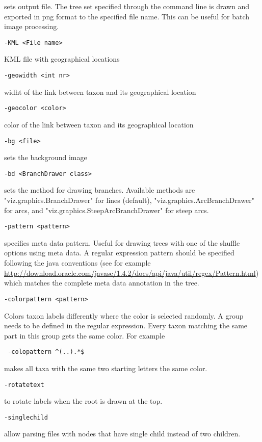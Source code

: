 \documentclass{article}
\begin{document}
sets output file. The tree set specified through the command line is drawn and
exported in png format to the specified file name. 
This can be useful for batch image processing.
\begin{verbatim}-KML <File name>\end{verbatim}
KML file with geographical locations
\begin{verbatim}-geowidth <int nr>\end{verbatim}
widht of the link between taxon and its geographical location
\begin{verbatim}-geocolor <color>\end{verbatim}
color of the link between taxon and its geographical location
\begin{verbatim}-bg <file>\end{verbatim}
sets the background image
\begin{verbatim}-bd <BranchDrawer class>\end{verbatim}
sets the method for drawing branches. Available methods are
"viz.graphics.BranchDrawer" for lines (default),
"viz.graphics.ArcBranchDrawer" for arcs, and
"viz.graphics.SteepArcBranchDrawer" for steep arcs.
\begin{verbatim}-pattern <pattern>\end{verbatim}
specifies meta data pattern. Useful for drawing trees with one of the
shuffle options using meta data. A regular expression pattern should be
specified following the java conventions (see for example
\url{http://download.oracle.com/javase/1.4.2/docs/api/java/util/regex/Pattern.html})
which matches the complete meta data annotation in the tree.
\begin{verbatim}-colorpattern <pattern>\end{verbatim}
Colors taxon labels differently where the color is selected randomly.
A group needs to be defined in the regular expression.
Every taxon matching the same part in this group gets the same color.
For example \begin{verbatim} -colopattern ^(..).*$\end{verbatim} makes all taxa with the same
two starting letters the same color.
\begin{verbatim}-rotatetext\end{verbatim}
to rotate labels when the root is drawn at the top.
\begin{verbatim}-singlechild\end{verbatim}
allow parsing files with nodes that have single child instead of two children.
\end{document}

